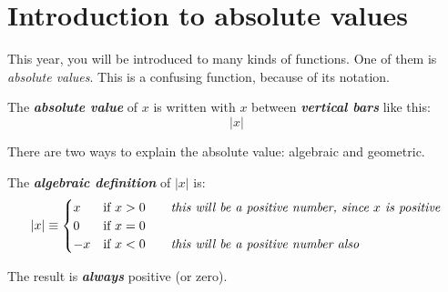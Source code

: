 

\section*{Introduction to absolute values}

This year, you will be introduced to many kinds of functions.
One of them is \emph{absolute values}.
This is a confusing function, because of its notation.

\begin{center}
    \begin{tcolorbox}[width=3.5in]
        The {\bfseries\itshape absolute value} of $x$ is written with $x$ 
        between {\bfseries\itshape vertical bars} like this:
        \[   |x|   \]
    \end{tcolorbox}
\end{center}

There are two ways to explain the absolute value: algebraic and geometric.

\begin{center}
    \begin{tcolorbox}[width=5in]
    The {\bfseries\itshape algebraic definition} of $|x|$ is:
    \[ 
        |x| \equiv
        \begin{cases} 
            x &  \text{if } x>0 \qquad\text{\itshape this will be a positive number, since $x$ is positive}\\
            0 &  \text{if } x=0 \\
            -x & \text{if } x<0 \qquad\text{\itshape this will be a positive number also}
        \end{cases}
    \]
    
    The result is {\bfseries\itshape always} positive (or zero).
    \end{tcolorbox}
    \end{center}

